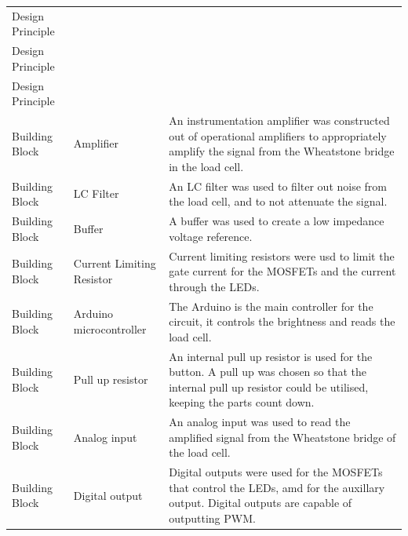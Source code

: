 \documentclass[twoside]{article}
\begin{document}
\begin{appendices}
\begin{table}[h]
\begin{tabularx}{\linewidth}{l l X}
                Design Principle &  &  \\
                Design Principle &  &  \\
                Design Principle &  &  \\
                Building Block & Amplifier & An instrumentation amplifier was constructed out of operational amplifiers to appropriately amplify the signal from the Wheatstone bridge in the load cell. \\
                Building Block & LC Filter & An LC filter was used to filter out noise from the load cell, and to not attenuate the signal. \\
                Building Block & Buffer & A buffer was used to create a low impedance voltage reference. \\
                Building Block & Current Limiting Resistor & Current limiting resistors were usd to limit the gate current for the MOSFETs and the current through the LEDs. \\
                Building Block & Arduino microcontroller & The Arduino is the main controller for the circuit, it controls the brightness and reads the load cell. \\
                Building Block & Pull up resistor & An internal pull up resistor is used for the button. A pull up was chosen so that the internal pull up resistor could be utilised, keeping the parts count down.\\
                Building Block & Analog input & An analog input was used to read the amplified signal from the Wheatstone bridge of the load cell. \\
                Building Block & Digital output & Digital outputs were used for the MOSFETs that control the LEDs, amd for the auxillary output. Digital outputs are capable of outputting PWM. \\
                \bottomrule
            \end{tabularx}
        \end{table}
    \newpage

\end{appendices}
\end{document}
